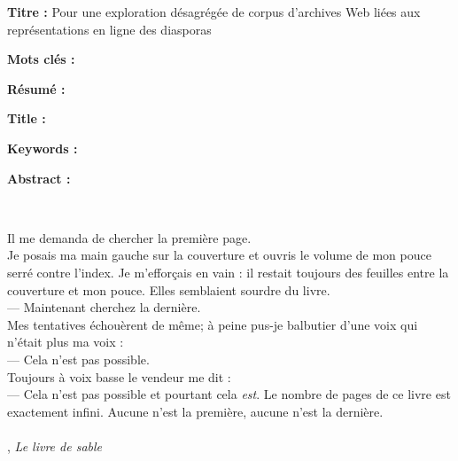 \documentclass[symmetric,justified,marginals=raggedouter]{tufte-book}
\newcommand{\blankpage}{\newpage\hbox{}\thispagestyle{empty}\newpage}
\begin{document}
\blankpage

  
\newpage
\begin{fullwidth}
\thispagestyle{empty}
\setlength{\parskip}{\baselineskip}

\noindent\textbf{Titre :}  Pour une exploration désagrégée de corpus d'archives Web liées aux représentations en ligne des diasporas 

\noindent\textbf{Mots clés :}

\noindent\textbf{Résumé :}

\vfill

\noindent\textbf{Title :} 

\noindent\textbf{Keywords :}

\noindent\textbf{Abstract :}


\end{fullwidth}
  
\thispagestyle{empty}%
\clearpage%


\newpage

~\vfill
\noindent
\par\noindent \og Il me demanda de chercher la première page.\\
\noindent Je posais ma main gauche sur la couverture et ouvris le volume de mon pouce serré contre l'index. Je m'efforçais en vain : il restait toujours des feuilles entre la couverture et mon pouce. Elles semblaient sourdre du livre.\\
--- Maintenant cherchez la dernière.\\
\noindent Mes tentatives échouèrent de même; à peine pus-je balbutier d'une voix qui n'était plus ma voix :\\
--- Cela n'est pas possible.\\
\noindent Toujours à voix basse le vendeur me dit : \\
--- Cela n'est pas possible et pourtant cela \textit{est}. Le nombre de pages de ce livre est exactement infini. Aucune n'est la première, aucune n'est la dernière. \fg
\\~\\
\noindent {}, \textit{Le livre de sable} 
\vfill
\indent

\end{document}
